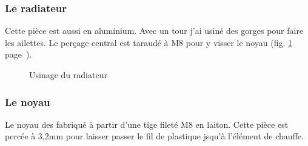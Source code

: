 \subsubsection{Le radiateur}%
Cette pièce est aussi en aluminium. Avec un tour j'ai usiné des gorges pour faire les ailettes.%
Le perçage central est taraudé à M8 pour y visser le noyau (fig. \ref{usinage_radiateur} %
page~\pageref{usinage_radiateur}).%
\begin{figure}%
   \caption{\label{usinage_radiateur} Usinage du radiateur}%
\end{figure}%
\subsubsection{Le noyau}%
Le noyau des fabriqué à partir d'une tige fileté M8 en laiton. Cette pièce est percée à 3,2mm %
pour laisser passer le fil de plastique jsqu'à l'élément de chauffe.%
